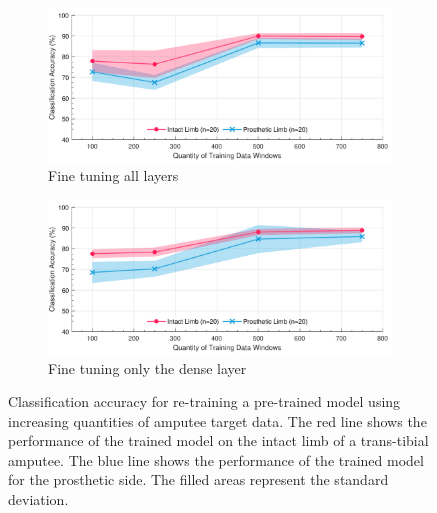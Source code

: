 \begin{figure}[hbtp]
    \centering
    \begin{subfigure}{\textwidth}
        \includegraphics[width=\textwidth]{content/6-Amputee/ch6_pre_trained_model_accuracy.pdf}
        \caption{Fine tuning all layers}
    \end{subfigure}
    \begin{subfigure}{\textwidth}
        \includegraphics[width=\textwidth]{content/6-Amputee/ch6_frozen_lstm_layer_accuracy.pdf}
        \caption{Fine tuning only the dense layer}
    \end{subfigure}
    \caption[Classification accuracy for re-training a pre-trained model using increasing quantities of amputee target data]{Classification accuracy for re-training a pre-trained model using increasing quantities of amputee target data. The red line shows the performance of the trained model on the intact limb of a trans-tibial amputee. The blue line shows the performance of the trained model for the prosthetic side. The filled areas represent the standard deviation.}
    \label{fig:ch6-amputee-retrain-pre-trained}
\end{figure}
